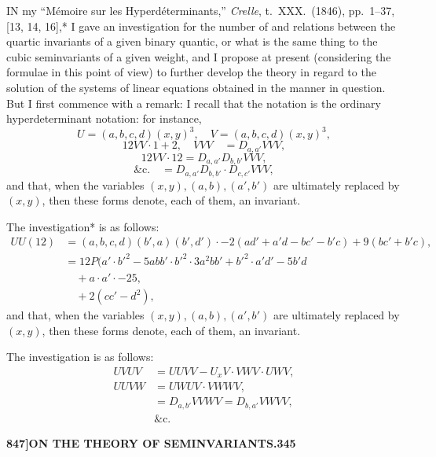\documentclass[12pt,a4paper]{article}
\theoremstyle{definition}
\begin{document}
\bigskip

\noindent IN my ``M\'emoire sur les Hyperd\'eterminants,'' \textit{Crelle}, t.\ XXX.\ (1846), pp.\ 1--37, [13, 14, 16],* I gave an investigation for the number of and relations between the quartic invariants of a given binary quantic, or what is the same thing to the cubic seminvariants of a given weight, and I propose at present (considering the formulae in this point of view) to further develop the theory in regard to the solution of the systems of linear equations obtained in the manner in question. But I first commence with a remark: I recall that the notation is the ordinary hyperdeterminant notation: for instance,
\[
U = (a, b, c, d)(x, y)^3, \quad V = (a, b, c, d)(x, y)^3,
\]
\[
12VV \cdot 1 + 2,\quad VVV \quad = D_{a,a'} VVV,
\]
\[
12VV \cdot 12 = D_{a,a'} D_{b,b'} VVV,
\]
\[
\&\text{c.}\quad = D_{a,a'} D_{b,b'} \cdot D_{c,c'} VVV,
\]
and that, when the variables $(x, y), (a, b), (a', b')$ are ultimately replaced by $(x, y)$, then these forms denote, each of them, an invariant.

The investigation* is as follows:
\begin{align*}
UU(12) &= (a, b, c, d)(b', a)(b', d') \cdot - 2(ad' + a'd - bc' - b'c) + 9(bc' + b'c), \\
&= 12P(a' \cdot b'^2 - 5abb' \cdot b'^2 \cdot 3a^2bb' + b'^2 \cdot a'd' - 5b'd \\
&\quad + a \cdot a' \cdot - 25, \\
&\quad + 2(cc' - d^2),
\end{align*}
and that, when the variables $(x, y), (a, b), (a', b')$ are ultimately replaced by $(x, y)$, then these forms denote, each of them, an invariant.

The investigation is as follows:
\begin{align*}
UVUV &= UUVV - U_x V \cdot VWV \cdot UWV, \\
UUVW &= UWUV \cdot VWWV, \\
&= D_{a,b'} VVWV = D_{b,a'} VWVV, \\
&\&\text{c.}
\end{align*}


\newpage
\setcounter{page}{345}

\noindent\textbf{847]}\hfill\textbf{ON THE THEORY OF SEMINVARIANTS.}\hfill\textbf{345}

\bigskip
\end{document}
